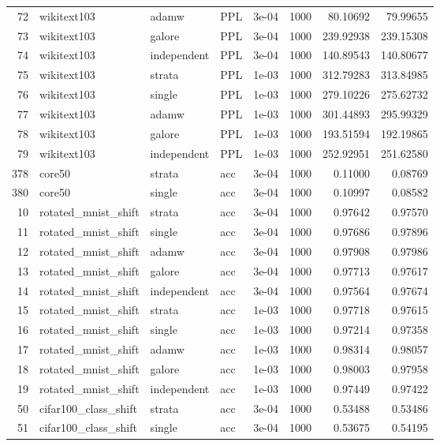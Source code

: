 \begin{longtable}{rlllrrrr}
72 & wikitext103 & adamw & PPL & 3e-04 & 1000 & 80.10692 & 79.99655 \\
73 & wikitext103 & galore & PPL & 3e-04 & 1000 & 239.92938 & 239.15308 \\
74 & wikitext103 & independent & PPL & 3e-04 & 1000 & 140.89543 & 140.80677 \\
\rowcolor{oursbg}
75 & wikitext103 & strata & PPL & 1e-03 & 1000 & 312.79283 & 313.84985 \\
76 & wikitext103 & single & PPL & 1e-03 & 1000 & 279.10226 & 275.62732 \\
77 & wikitext103 & adamw & PPL & 1e-03 & 1000 & 301.44893 & 295.99329 \\
78 & wikitext103 & galore & PPL & 1e-03 & 1000 & 193.51594 & 192.19865 \\
79 & wikitext103 & independent & PPL & 1e-03 & 1000 & 252.92951 & 251.62580 \\
\rowcolor{oursbg}
378 & core50 & strata & acc & 3e-04 & 1000 & 0.11000 & 0.08769 \\
380 & core50 & single & acc & 3e-04 & 1000 & 0.10997 & 0.08582 \\
\rowcolor{oursbg}
10 & rotated\_mnist\_shift & strata & acc & 3e-04 & 1000 & 0.97642 & 0.97570 \\
11 & rotated\_mnist\_shift & single & acc & 3e-04 & 1000 & 0.97686 & 0.97896 \\
12 & rotated\_mnist\_shift & adamw & acc & 3e-04 & 1000 & 0.97908 & 0.97986 \\
13 & rotated\_mnist\_shift & galore & acc & 3e-04 & 1000 & 0.97713 & 0.97617 \\
14 & rotated\_mnist\_shift & independent & acc & 3e-04 & 1000 & 0.97564 & 0.97674 \\
\rowcolor{oursbg}
15 & rotated\_mnist\_shift & strata & acc & 1e-03 & 1000 & 0.97718 & 0.97615 \\
16 & rotated\_mnist\_shift & single & acc & 1e-03 & 1000 & 0.97214 & 0.97358 \\
17 & rotated\_mnist\_shift & adamw & acc & 1e-03 & 1000 & 0.98314 & 0.98057 \\
18 & rotated\_mnist\_shift & galore & acc & 1e-03 & 1000 & 0.98003 & 0.97958 \\
19 & rotated\_mnist\_shift & independent & acc & 1e-03 & 1000 & 0.97449 & 0.97422 \\
\rowcolor{oursbg}
50 & cifar100\_class\_shift & strata & acc & 3e-04 & 1000 & 0.53488 & 0.53486 \\
51 & cifar100\_class\_shift & single & acc & 3e-04 & 1000 & 0.53675 & 0.54195 \\

\end{longtable}
